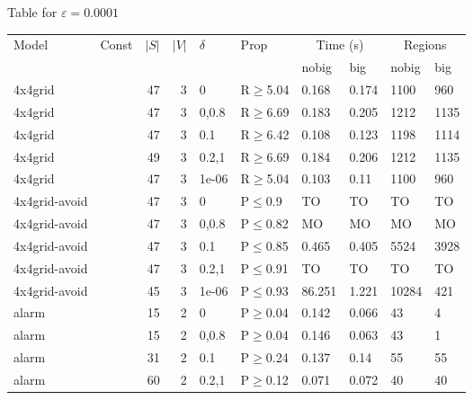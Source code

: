 \small Table for \(\varepsilon=0.0001\)
\begin{longtable}{llrrllllll}

        \toprule
        Model & Const & $|S|$ & $|V|$ & $\delta$ & Prop & \multicolumn{2}{c}{Time (s)} & \multicolumn{2}{c}{Regions} \\
        \cmidrule(ll){7-8} \cmidrule(ll){9-10}
        & & & & & & nobig & big & nobig & big \\
        \midrule
        
 4x4grid       &           &     	47 &   3 & 0     & R$\geq$5.04  & 0.168    & 0.174    & 1100    & 960     \\
 4x4grid       &           &     	47 &   3 & 0,0.8 & R$\geq$6.69  & 0.183    & 0.205    & 1212    & 1135    \\
 4x4grid       &           &     	47 &   3 & 0.1   & R$\geq$6.42  & 0.108    & 0.123    & 1198    & 1114    \\
 4x4grid       &           &     	49 &   3 & 0.2,1 & R$\geq$6.69  & 0.184    & 0.206    & 1212    & 1135    \\
 4x4grid       &           &     	47 &   3 & 1e-06 & R$\geq$5.04  & 0.103    & 0.11     & 1100    & 960     \\
 4x4grid-avoid &           &     	47 &   3 & 0     & P$\leq$0.9   & TO       & TO       & TO      & TO      \\
 4x4grid-avoid &           &     	47 &   3 & 0,0.8 & P$\leq$0.82  & MO       & MO       & MO      & MO      \\
 4x4grid-avoid &           &     	47 &   3 & 0.1   & P$\leq$0.85  & 0.465    & 0.405    & 5524    & 3928    \\
 4x4grid-avoid &           &     	47 &   3 & 0.2,1 & P$\leq$0.91  & TO       & TO       & TO      & TO      \\
 4x4grid-avoid &           &     	45 &   3 & 1e-06 & P$\leq$0.93  & 86.251   & 1.221    & 10284   & 421     \\
 alarm         &           &     	15 &   2 & 0     & P$\geq$0.04  & 0.142    & 0.066    & 43      & 4       \\
 alarm         &           &     	15 &   2 & 0,0.8 & P$\geq$0.04  & 0.146    & 0.063    & 43      & 1       \\
 alarm         &           &     	31 &   2 & 0.1   & P$\geq$0.24  & 0.137    & 0.14     & 55      & 55      \\
 alarm         &           &     	60 &   2 & 0.2,1 & P$\geq$0.12  & 0.071    & 0.072    & 40      & 40      \\

\end{longtable}
